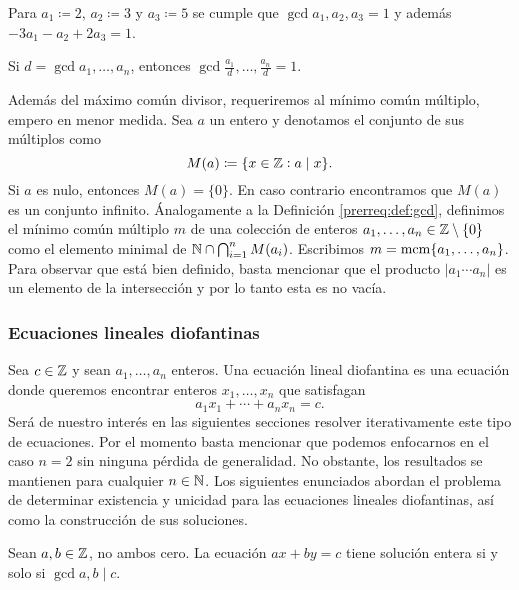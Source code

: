 \begin{example}
	Para $a_1 \coloneq 2$, $a_2 \coloneq 3$ y $a_3 \coloneq 5$ se cumple que $\gcd{a_1, a_2, a_3} =
	1$ y además $-3a_1 - a_2 + 2a_3 = 1$.
\end{example}

\begin{lemma}
	\label{prerreq:lemma:gcd}
	Si $d = \gcd{a_1, \ldots, a_n}$, entonces $\gcd{\frac{a_1}{d}, \ldots, \frac{a_n}{d}} = 1$.
\end{lemma}

Además del máximo común divisor, requeriremos al mínimo común múltiplo, empero en menor medida. Sea
$a$ un entero y denotamos el conjunto de sus múltiplos como
\begin{equation*}
	M(a) \coloneq \lbrace x \in \mathbb{Z} \vcentcolon a \mid x \rbrace.
\end{equation*}
Si $a$ es nulo, entonces $M(a) = \lbrace 0 \rbrace$. En caso contrario encontramos que $M(a)$ es un
conjunto infinito. Ánalogamente a la Definición \ref{prerreq:def:gcd}, definimos el mínimo común
múltiplo $m$ de una colección de enteros $a_1, \ldots, a_n \in \mathbb{Z} \setminus \lbrace 0 \rbrace$ como
el elemento minimal de $\mathbb{N} \cap \bigcap_{i=1}^{n}M(a_i)$. Escribimos $m = \mathop{\mathrm{mcm}{\left\lbrace a_1, \ldots, a_n \right\rbrace}}$.
Para observar que está bien definido, basta mencionar que el producto $|a_1 \cdots a_n|$ es un
elemento de la intersección y por lo tanto esta es no vacía.

\subsubsection{Ecuaciones lineales diofantinas}

\noindent
Sea $c \in \mathbb{Z}$ y sean $a_1, \ldots, a_n$ enteros. Una ecuación lineal diofantina es una ecuación
donde queremos encontrar enteros $x_1, \ldots, x_n$ que satisfagan
\begin{equation*}
	a_1x_1 + \cdots + a_nx_n = c.
\end{equation*}
Será de nuestro interés en las siguientes secciones resolver iterativamente este tipo de ecuaciones.
Por el momento basta mencionar que podemos enfocarnos en el caso $n = 2$ sin ninguna pérdida de
generalidad. No obstante, los resultados se mantienen para cualquier $n \in \mathbb{N}$. Los siguientes
enunciados abordan el problema de determinar existencia y unicidad para las ecuaciones lineales
diofantinas, así como la construcción de sus soluciones.

\begin{theorem}[Existencia]
	\label{prerreq:th:existence}
	Sean $a, b \in \mathbb{Z}$, no ambos cero. La ecuación $ax + by = c$ tiene solución entera si y solo si
	$\gcd{a, b} \mid c$.
\end{theorem}

